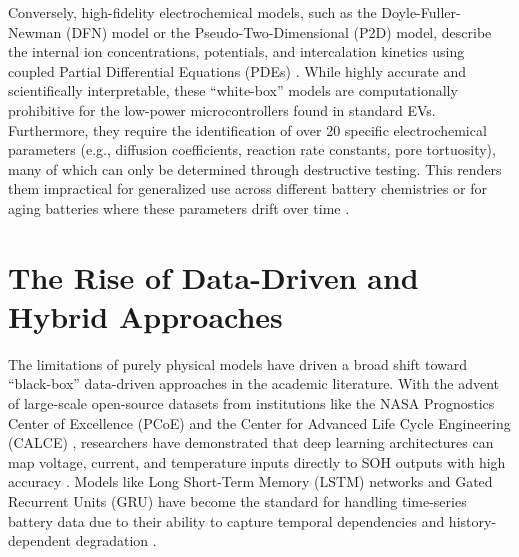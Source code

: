 Conversely, high-fidelity electrochemical models, such as the Doyle-Fuller-Newman (DFN) model or the Pseudo-Two-Dimensional (P2D) model, describe the internal ion concentrations, potentials, and intercalation kinetics using coupled Partial Differential Equations (PDEs) \cite{wang_pinn}. While highly accurate and scientifically interpretable, these ``white-box'' models are computationally prohibitive for the low-power microcontrollers found in standard EVs. Furthermore, they require the identification of over 20 specific electrochemical parameters (e.g., diffusion coefficients, reaction rate constants, pore tortuosity), many of which can only be determined through destructive testing. This renders them impractical for generalized use across different battery chemistries or for aging batteries where these parameters drift over time \cite{unmeasurable_states}.

\section{The Rise of Data-Driven and Hybrid Approaches}

The limitations of purely physical models have driven a broad shift toward ``black-box'' data-driven approaches in the academic literature. With the advent of large-scale open-source datasets from institutions like the NASA Prognostics Center of Excellence (PCoE) and the Center for Advanced Life Cycle Engineering (CALCE) \cite{nasa_datasets, he_calce}, researchers have demonstrated that deep learning architectures can map voltage, current, and temperature inputs directly to SOH outputs with high accuracy \cite{severson_data, machine_learning_web}. Models like Long Short-Term Memory (LSTM) networks \cite{hochreiter_lstm} and Gated Recurrent Units (GRU) \cite{cho_gru} have become the standard for handling time-series battery data due to their ability to capture temporal dependencies and history-dependent degradation \cite{zhang_rnn}.

